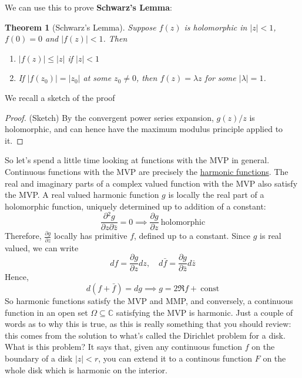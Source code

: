 \documentclass{article}
\newtheorem{theorem}{Theorem}
\newcommand{\mbb}[1]{\mathbb{#1}}
\newcommand{\prt}[2]{{\frac{\partial {#1}}{\partial {#2}}}}
\begin{document}
We can use this to prove \textbf{Schwarz's Lemma}:
\begin{theorem}[Schwarz's Lemma]
Suppose \(f(z)\) is holomorphic in \(|z| < 1\), \(f(0) = 0\) and \(|f(z)| < 1\). Then
\begin{enumerate}

  \item \(|f(z)| \leq |z|\) if \(|z| < 1\)

  \item If \(|f(z_0)| = |z_0|\) at some \(z_0 \neq 0\), then \(f(z) = \lambda z\) for some \(|\lambda| = 1\).

\end{enumerate}
\end{theorem}
We recall a sketch of the proof
\begin{proof} (Sketch)
By the convergent power series expansion, \(g(z) / z\) is holomorphic, and can hence have the maximum modulus principle applied to it.
\end{proof}
So let's spend a little time looking at functions with the MVP in general. Continuous functions with the MVP are precisely the \underline{harmonic functions}. The real and imaginary parts of a complex valued function with the MVP also satisfy the MVP. A real valued harmonic function \(g\) is locally the real part of a holomorphic function, uniquely determined up to addition of a constant:
\begin{equation}
\prt{^2g}{z\partial\bar{z}} = 0 \implies \prt{g}{z} \ \text{holomorphic}
\end{equation}
Therefore, \(\prt{g}{z}\) locally has primitive \(f\), defined up to a constant. Since \(g\) is real valued, we can write
\begin{equation}df = \prt{g}{z}dz, \quad d\bar{f} = \prt{g}{\bar{z}}d\bar{z}\end{equation}
Hence,
\begin{equation}d(f + \bar{f}) = dg \implies g = 2\Re f + \ \text{const}\end{equation}
So harmonic functions satisfy the MVP and MMP, and conversely, a continuous function in an open set \(\Omega \subseteq \mbb{C}\) satisfying the MVP is harmonic. Just a couple of words as to why this is true, as this is really something that you should review: this comes from the solution to what's called the Dirichlet problem for a disk. What is this problem? It says that, given any continuous function \(f\) on the boundary of a disk \(|z| < r\), you can extend it to a continous function \(F\) on the whole disk which is harmonic on the interior.
\end{document}
